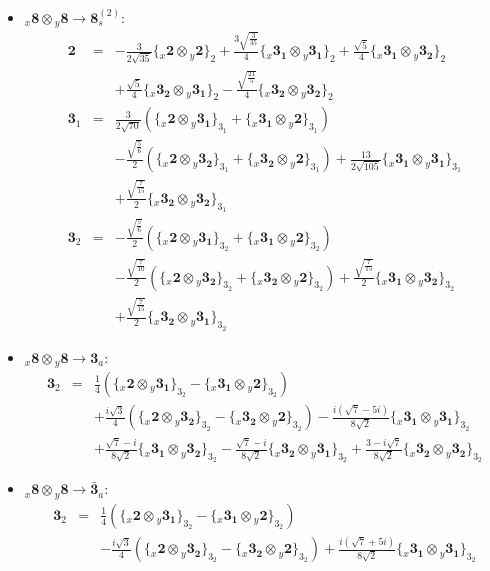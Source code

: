 \documentclass[english]{article}
\newcommand{\rep}[1]{\mathbf{#1}}
\newcommand{\repx}[2]{{}_{#2}\mathbf{#1}}
\newcommand{\subcg}[3]{\big\{ \repx{#1}{x}\otimes\repx{#2}{y}\big\}^{}_{#3}}
\begin{document}
\begin{itemize}
\item $\repx{8}{x}\otimes\repx{8}{y}\to\rep{8}_{s}^{(2)}$:
\begin{eqnarray*}
\rep{2} &=& -\frac{3}{2 \sqrt{35}}\subcg{2}{2}{2}+\frac{3 \sqrt{\frac{3}{35}}}{4}\subcg{3_{1}}{3_{1}}{2}+\frac{\sqrt{5}}{4}\subcg{3_{1}}{3_{2}}{2} \\ 
 & & +\frac{\sqrt{5}}{4}\subcg{3_{2}}{3_{1}}{2}-\frac{\sqrt{\frac{21}{5}}}{4}\subcg{3_{2}}{3_{2}}{2}
\\
\rep{3}_{1} &=& \frac{3}{2 \sqrt{70}}\left(\subcg{2}{3_{1}}{3_{1}}+\subcg{3_{1}}{2}{3_{1}}\right) \\ 
 & & -\frac{\sqrt{\frac{5}{6}}}{2}\left(\subcg{2}{3_{2}}{3_{1}}+\subcg{3_{2}}{2}{3_{1}}\right)+\frac{13}{2 \sqrt{105}}\subcg{3_{1}}{3_{1}}{3_{1}} \\ 
 & & +\frac{\sqrt{\frac{7}{15}}}{2}\subcg{3_{2}}{3_{2}}{3_{1}}
\\
\rep{3}_{2} &=& -\frac{\sqrt{\frac{5}{6}}}{2}\left(\subcg{2}{3_{1}}{3_{2}}+\subcg{3_{1}}{2}{3_{2}}\right) \\ 
 & & -\frac{\sqrt{\frac{7}{10}}}{2}\left(\subcg{2}{3_{2}}{3_{2}}+\subcg{3_{2}}{2}{3_{2}}\right)+\frac{\sqrt{\frac{7}{15}}}{2}\subcg{3_{1}}{3_{2}}{3_{2}} \\ 
 & & +\frac{\sqrt{\frac{7}{15}}}{2}\subcg{3_{2}}{3_{1}}{3_{2}}
\end{eqnarray*}
\item $\repx{8}{x}\otimes\repx{8}{y}\to\rep{3}_{a}$:
\begin{eqnarray*}
\rep{3}_{2} &=& \frac{1}{4}\left(\subcg{2}{3_{1}}{3_{2}}-\subcg{3_{1}}{2}{3_{2}}\right) \\ 
 & & +\frac{i \sqrt{3}}{4}\left(\subcg{2}{3_{2}}{3_{2}}-\subcg{3_{2}}{2}{3_{2}}\right)-\frac{i \left(\sqrt{7}-5 i\right)}{8 \sqrt{2}}\subcg{3_{1}}{3_{1}}{3_{2}} \\ 
 & & +\frac{\sqrt{7}-i}{8 \sqrt{2}}\subcg{3_{1}}{3_{2}}{3_{2}}-\frac{\sqrt{7}-i}{8 \sqrt{2}}\subcg{3_{2}}{3_{1}}{3_{2}}+\frac{3-i \sqrt{7}}{8 \sqrt{2}}\subcg{3_{2}}{3_{2}}{3_{2}}
\end{eqnarray*}
\item $\repx{8}{x}\otimes\repx{8}{y}\to\rep{\bar{3}}_{a}$:
\begin{eqnarray*}
\rep{3}_{2} &=& \frac{1}{4}\left(\subcg{2}{3_{1}}{3_{2}}-\subcg{3_{1}}{2}{3_{2}}\right) \\ 
 & & -\frac{i \sqrt{3}}{4}\left(\subcg{2}{3_{2}}{3_{2}}-\subcg{3_{2}}{2}{3_{2}}\right)+\frac{i \left(\sqrt{7}+5 i\right)}{8 \sqrt{2}}\subcg{3_{1}}{3_{1}}{3_{2}} \\ 

\end{eqnarray*}
\end{itemize}
\end{document}
